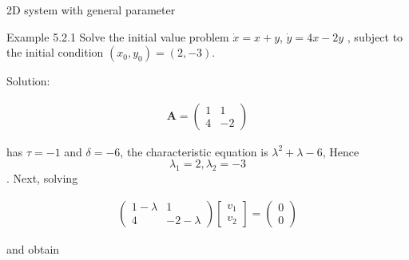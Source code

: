 \documentclass[9pt,aspectratio=43,mathserif,table]{beamer}
\begin{document}
\begin{frame}{2D system with general parameter}

  \begin{multicols}{2}
 Example 5.2.1
  Solve the initial value problem $\dot x = x + y$, $\dot y = 4x-  2y$ , subject to the initial condition $( x_0 , y_0) = (2, -3)$.

  \medskip

  Solution:

    \begin{equation*}
      \begin{aligned}
      \symbf{A} = 
        \begin{pmatrix}
          1 & 1 \\
          4 & -2
        \end{pmatrix}
      \end{aligned}
    \end{equation*}

   has $\tau = -1$ and $\delta = -6$, the characteristic equation is $\lambda ^2 + \lambda - 6$, Hence
   $$\lambda_1 = 2, \lambda_2 = -3$$. Next, solving
   
    \begin{equation}
      \begin{aligned}
        \begin{pmatrix}
          1-\lambda & 1 \\
          4 & -2-\lambda
        \end{pmatrix}
        \begin{bmatrix}
          v_1\\
          v_2
        \end{bmatrix}
        =
        \begin{pmatrix}
          0\\
          0
        \end{pmatrix}
      \end{aligned}
    \end{equation}
    
    and obtain


\end{multicols}
\end{frame}
\end{document}
